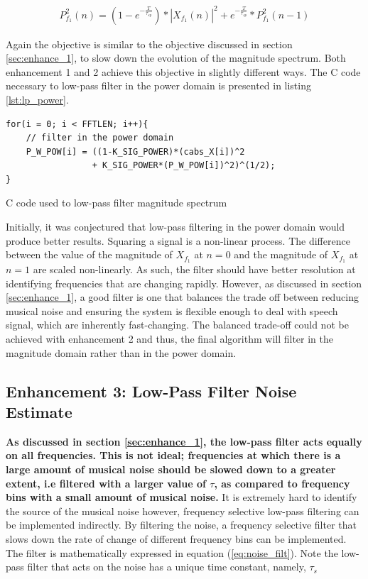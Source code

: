 \documentclass[a4paper,pra,twocolumn,10pt,aps,longbibliography,nobalancelastpage]{revtex4-1}
\begin{document}
\begin{align}
    P_{f_{1}}^{2}(n) = (1 - e^{-\frac{T}{\tau_{sp}}})*|X_{f_{1}}(n)|^{2} + e^{-\frac{T}{\tau_{sp}}}*P_{f_{1}}^{2}(n-1)\label{eq:lp_power}
\end{align}

Again the objective is similar to the objective discussed in section \ref{sec:enhance_1}, to slow down the evolution of the magnitude spectrum. Both enhancement 1 and 2 achieve this objective in slightly different ways. The C code necessary to low-pass filter in the power domain is presented in listing \ref{lst:lp_power}.

\begin{listing}[H]
\begin{verbatim}
for(i = 0; i < FFTLEN; i++){
    // filter in the power domain
    P_W_POW[i] = ((1-K_SIG_POWER)*(cabs_X[i])^2 
                 + K_SIG_POWER*(P_W_POW[i])^2)^(1/2);
}	
\end{verbatim}
\caption{C code used to low-pass filter magnitude spectrum} 
\label{lst:lp_power}
\end{listing}

Initially, it was conjectured that low-pass filtering in the power domain would produce better results. Squaring a signal is a non-linear process. The difference between the value of the magnitude of $X_{f_{1}}$ at $n=0$ and the magnitude of  $X_{f_{1}}$ at $n=1$ are scaled non-linearly. As such, the filter should have better resolution at identifying frequencies that are changing rapidly. However, as discussed in section \ref{sec:enhance_1}, a good filter is one that balances the trade off between reducing musical noise and ensuring the system is flexible enough to deal with speech signal, which are inherently fast-changing. The balanced trade-off could not be achieved with enhancement 2 and thus, the final algorithm will filter in the magnitude domain rather than in the power domain.

\subsection{Enhancement 3: Low-Pass Filter Noise Estimate}\label{sec:noise_filter}

\textbf{As discussed in section \ref{sec:enhance_1}, the low-pass filter acts equally on all frequencies. This is not ideal; frequencies at which there is a large amount of musical noise should be slowed down to a greater extent, i.e filtered with a larger value of $\tau$, as compared to frequency bins with a small amount of musical noise.} It is extremely hard to identify the source of the musical noise however, frequency selective low-pass filtering can be implemented indirectly. By filtering the noise, a frequency selective filter that slows down the rate of change of different frequency bins can be implemented. The filter is mathematically expressed in equation (\ref{eq:noise_filt}). Note the low-pass filter that acts on the noise has a unique time constant, namely, $\tau_{s}$
\end{document}
